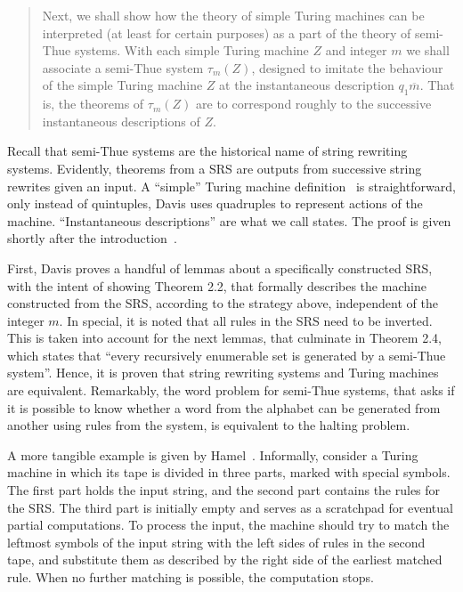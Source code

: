 \documentclass[12pt]{article}
\begin{document}
\begin{quote}
    Next, we shall show how the theory of simple Turing machines can be interpreted (at least for certain purposes) as a part of the theory of semi-Thue systems. With each simple Turing machine $Z$ and integer $m$ we shall associate a semi-Thue system $\tau_{m}(Z)$, designed to imitate the behaviour of the simple Turing machine $Z$ at the instantaneous description $q_{1}\overline{m}$. That is, the theorems of $\tau_{m}(Z)$ are to correspond roughly to the successive instantaneous descriptions of $Z$.
\end{quote}

Recall that semi-Thue systems are the historical name of string rewriting systems. Evidently, theorems from a SRS are outputs from successive string rewrites given an input. A ``simple'' Turing machine definition~\cite[Sec. 1.1, Def. 1.3]{Davis:book:1958} is straightforward, only instead of quintuples, Davis uses quadruples to represent actions of the machine. ``Instantaneous descriptions'' are what we call states. The proof is given shortly after the introduction~\cite[pp. 88--93]{Davis:book:1958}. 

First, Davis proves a handful of lemmas about a specifically constructed SRS, with the intent of showing Theorem 2.2, that formally describes the machine constructed from the SRS, according to the strategy above, independent of the integer $m$. In special, it is noted that all rules in the SRS need to be inverted. This is taken into account for the next lemmas, that culminate in Theorem 2.4, which states that ``every recursively enumerable set is generated by a semi-Thue system''. Hence, it is proven that string rewriting systems and Turing machines are equivalent. Remarkably, the word problem for semi-Thue systems, that asks if it is possible to know whether a word from the alphabet can be generated from another using rules from the system, is equivalent to the halting problem.

A more tangible example is given by Hamel~\cite{Hamel:misc:2016:sep}. Informally, consider a Turing machine in which its tape is divided in three parts, marked with special symbols. The first part holds the input string, and the second part contains the rules for the SRS. The third part is initially empty and serves as a scratchpad for eventual partial computations. To process the input, the machine should try to match the leftmost symbols of the input string with the left sides of rules in the second tape, and substitute them as described by the right side of the earliest matched rule. When no further matching is possible, the computation stops.
\end{document}
